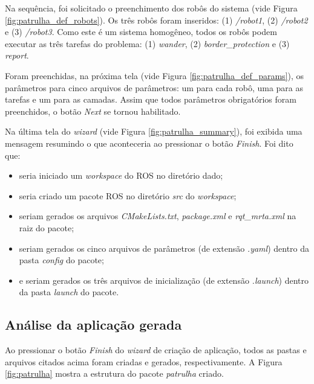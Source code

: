             Na sequência, foi solicitado o preenchimento dos robôs do sistema (vide Figura \ref{fig:patrulha_def_robots}). Os três robôs foram inseridos: (1) \textit{/robot1}, (2) \textit{/robot2} e (3) \textit{/robot3}. Como este é um sistema homogêneo, todos os robôs podem executar as três tarefas do problema: (1) \textit{wander}, (2) \textit{border\_protection} e (3) \textit{report}.
            
            Foram preenchidas, na próxima tela (vide Figura \ref{fig:patrulha_def_params}), os parâmetros para cinco arquivos de parâmetros: um para cada robô, uma para as tarefas e um para as camadas. Assim que todos parâmetros obrigatórios foram preenchidos, o botão \textit{Next} se tornou habilitado. 
            
            Na última tela do \textit{wizard} (vide Figura \ref{fig:patrulha_summary}), foi exibida uma mensagem resumindo o que aconteceria ao pressionar o botão \textit{Finish}. Foi dito que: 
            
            \begin{itemize}
                \item seria iniciado um \textit{workspace} do ROS no diretório dado;
                \item seria criado um pacote ROS no diretório \textit{src} do \textit{workspace};
                \item seriam gerados os arquivos \textit{CMakeLists.txt}, \textit{package.xml} e \textit{rqt\_mrta.xml} na raiz do pacote;
                \item seriam gerados os cinco arquivos de parâmetros (de extensão \textit{.yaml}) dentro da pasta \textit{config} do pacote;
                \item e seriam gerados os três arquivos de inicialização (de extensão \textit{.launch}) dentro da pasta \textit{launch} do pacote.
            \end{itemize}
            
        \subsection{Análise da aplicação gerada} \label{subsec:analise_patrulha}
            Ao pressionar o botão \textit{Finish} do \textit{wizard} de criação de aplicação, todos as pastas e arquivos citados acima foram criadas e gerados, respectivamente. A Figura \ref{fig:patrulha} mostra a estrutura do pacote \textit{patrulha} criado.
            
